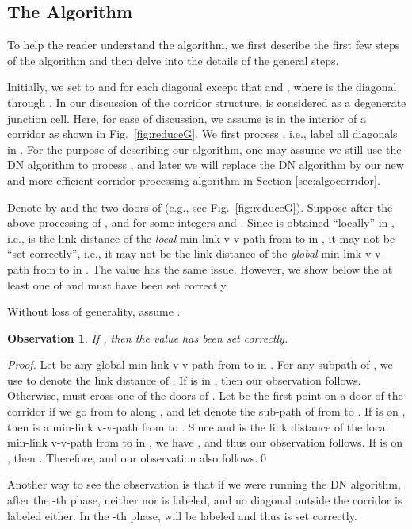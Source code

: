\documentclass[english,runningheads,11pt]{llncs-revised}
\newtheorem{observation}{Observation}
\begin{document}
\subsection{The Algorithm}

To help the reader understand the algorithm, we first describe the first few
steps of the algorithm and then delve into the details of the general steps.

Initially, we set  to  and  for each diagonal  except
that  and , where  is the diagonal through .
In our discussion of the corridor structure,  is
considered as a degenerate junction cell. Here, for ease of
discussion, we assume  is in the interior of a corridor  as shown
in Fig.~\ref{fig:reduceG}. We first process , i.e., label
all diagonals in .  For the purpose of describing our algorithm,
one may assume we still use the DN algorithm to process ,
and later we will replace the DN algorithm by our
new and more efficient corridor-processing algorithm in Section \ref{sec:algocorridor}.


Denote by  and  the two doors of  (e.g., see
Fig.~\ref{fig:reduceG}). Suppose after the above processing of
,  and  for some integers 
and .  Since  is obtained ``locally'' in ,
i.e.,  is the link distance of the {\em local} min-link v-v-path from
 to  in , it may not be ``set correctly'', i.e., it may not be
the link distance of the {\em global} min-link v-v-path from   to  in
. The value  has the same issue. However, we show
below the at least one of  and  must have been set
correctly.

Without loss of generality, assume .

\begin{observation}\label{obser:10}
If , then the value  has been set correctly.
\end{observation}
\begin{proof}
Let  be any global min-link v-v-path from  to  in . For any subpath  of ,
we use  to denote the link distance of .
If  is in
, then our observation follows. Otherwise,  must cross one of
the doors of . Let  be the first
point on a door of the corridor if we go from  to  along
, and let  denote the sub-path of  from  to . If  is on , then  is a min-link v-v-path from 
to . Since  and  is the link distance of the local
min-link v-v-path from  to  in , we have , and thus our observation follows. If 
is on , then . Therefore,  and our observation also follows.\qed
\end{proof}

Another way to see the observation is that if we were running the DN algorithm,
after the -th phase, neither  nor  is labeled, and
no diagonal outside the corridor is labeled either. In the -th
phase,  will be labeled and thus  is set
correctly.
\end{document}
